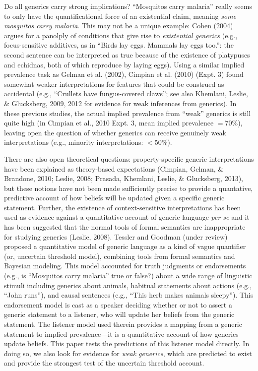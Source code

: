 \documentclass[floatsintext,man]{apa6}
\theoremstyle{definition}
\theoremstyle{definition}
\theoremstyle{definition}
\theoremstyle{remark}
\begin{document}
Do all generics carry strong implications? \enquote{Mosquitos carry
malaria} really seems to only have the quantificational force of an
existential claim, meaning \emph{some mosquitos carry malaria}. This may
not be a unique example: Cohen (2004) argues for a panolply of
conditions that give rise to \emph{existential generics} (e.g.,
focus-sensitive additives, as in \enquote{Birds lay eggs. Mammals lay
eggs too.}: the second sentence can be interpreted as true because of
the existence of platypuses and echidnas, both of which reproduce by
laying eggs). Using a similar implied prevalence task as Gelman et al.
(2002), Cimpian et al. (2010) (Expt. 3) found somewhat weaker
interpretations for features that could be construed as accidental
(e.g., ``Crullets have fungus-covered claws''; see also Khemlani,
Leslie, \& Glucksberg, 2009, 2012 for evidence for weak inferences from
generics). In these previous studies, the actual implied prevalence from
\enquote{weak} generics is still quite high (in Cimpian et al., 2010
Expt. 3, mean implied prevalence \(= 70\%\)), leaving open the question
of whether generics can receive genuinely weak interpretations (e.g.,
minority interpretations: \(< 50\%\)).

There are also open theoretical questions: property-specific generic
interpretations have been explained as theory-based expectations
(Cimpian, Gelman, \& Brandone, 2010; Leslie, 2008; Prasada, Khemlani,
Leslie, \& Glucksberg, 2013), but these notions have not been made
sufficiently precise to provide a quantative, predictive account of how
beliefs will be updated given a specific generic statement. Further, the
existence of context-sensitive interpretations has been used as evidence
against a quantitative account of generic language \emph{per se} and it
has been suggested that the normal tools of formal semantics are
inappropriate for studying generics (Leslie, 2008).
Tessler and Goodman (under review) proposed a quantitative model of
generic language as a kind of vague quantifier (or, uncertain threshold
model), combining tools from formal semantics and Bayesian modeling.
This model accounted for truth judgments or endorsements (e.g., is
\enquote{Mosquitos carry malaria} true or false?) about a wide range of
linguistic stimuli including generics about animals, habitual statements
about actions (e.g., \enquote{John runs}), and causal sentences (e.g.,
\enquote{This herb makes animals sleepy}). This endorsement model is
cast as a speaker deciding whether or not to assert a generic statement
to a listener, who will update her beliefs from the generic statement.
The listener model used therein provides a mapping from a generic
statement to implied prevalence---it is a quantitative account of how
generics update beliefs. This paper tests the predictions of this
listener model directly. In doing so, we also look for evidence for
\emph{weak generics}, which are predicted to exist and provide the
strongest test of the uncertain threshold account.
\end{document}
